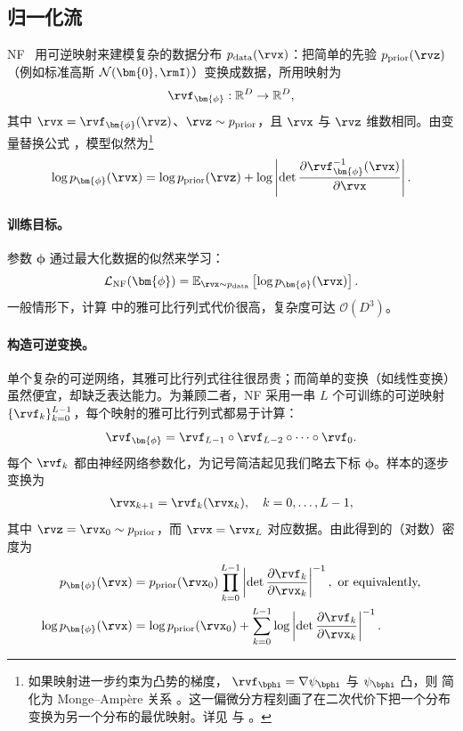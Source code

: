 \subsection{归一化流}

NF~\citep{rezende2015variational} 用可逆映射来建模复杂的数据分布 $p_{\text{data}}(\rvx)$：把简单的先验 $p_{\text{prior}}(\rvz)$（例如标准高斯 $\mathcal{N}(\bm{0}, \rmI)$）变换成数据，所用映射为
\[
\rvf_{\bm{\phi}}: \mathbb{R}^D \to \mathbb{R}^D,
\]
其中 $\rvx = \rvf_{\bm{\phi}}(\rvz)$、$\rvz \sim p_{\text{prior}}$，且 $\rvx$ 与 $\rvz$ 维数相同。由变量替换公式 ，模型似然为\footnote{如果映射进一步约束为凸势的梯度，
$\rvf_\bphi = \nabla \psi_\bphi$ 与 $\psi_\bphi$ 凸，则
 简化为 Monge--Ampère 关系 。这一偏微分方程刻画了在二次代价下把一个分布变换为另一个分布的最优映射。详见  与 \citep{huangconvex}。
}
\begin{align}\label{eq:nf-change-of-var-log}
\log p_{\bm{\phi}}(\rvx) = \log p_{\text{prior}}(\rvz) + \log \left| \det \frac{\partial \rvf_{\bm{\phi}}^{-1}(\rvx)}{\partial \rvx} \right|.
\end{align}


\paragraph{训练目标。}
参数 $\bm{\phi}$ 通过最大化数据的似然来学习：
\begin{align}\label{eq:nf-training}
\mathcal{L}_{\text{NF}}(\bm{\phi}) = \mathbb{E}_{\rvx \sim p_{\text{data}}} \left[ \log p_{\bm{\phi}}(\rvx) \right].
\end{align}
一般情形下，计算  中的雅可比行列式代价很高，复杂度可达 $\mathcal{O}(D^3)$。

\paragraph{构造可逆变换。}


单个复杂的可逆网络，其雅可比行列式往往很昂贵；而简单的变换（如线性变换）虽然便宜，却缺乏表达能力。为兼顾二者，NF 采用一串 $L$ 个可训练的可逆映射 $\{\rvf_k\}_{k=0}^{L-1}$，每个映射的雅可比行列式都易于计算：
\[
\rvf_{\bm{\phi}} = \rvf_{L-1} \circ \rvf_{L-2} \circ \cdots \circ \rvf_0.
\]
每个 $\rvf_k$ 都由神经网络参数化，为记号简洁起见我们略去下标 ${\bm{\phi}}$。样本的逐步变换为
\begin{align}\label{eq:nf-seq}
\rvx_{k+1} = \rvf_k(\rvx_k), \quad k = 0, \ldots, L-1,
\end{align}
其中 $\rvz=\rvx_0 \sim p_{\text{prior}}$，而 $\rvx = \rvx_L$ 对应数据。由此得到的（对数）密度为
\begin{align}\label{eq:multi-nf-density}
\begin{aligned}
    p_{\bm{\phi}}(\rvx) &= p_{\text{prior}}(\rvx_0) \prod_{k=0}^{L-1} \left| \det \frac{\partial \rvf_k}{\partial \rvx_k} \right|^{-1}, \text{ or equivalently,}\\
\log p_{\bm{\phi}}(\rvx) &= \log p_{\text{prior}}(\rvx_0) + \sum_{k=0}^{L-1} \log \left| \det \frac{\partial \rvf_k}{\partial \rvx_k} \right|^{-1}.
\end{aligned}
\end{align}


